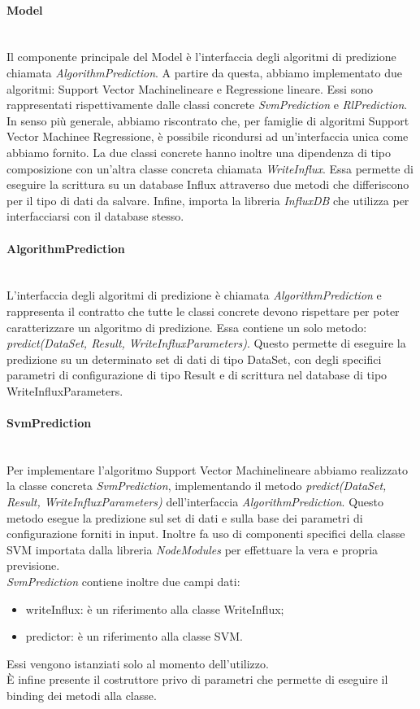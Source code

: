 \paragraph{Model} \mbox{}\\ [1mm]
Il componente principale del Model è l'interfaccia degli algoritmi di predizione chiamata \textit{AlgorithmPrediction}. A partire da questa, abbiamo implementato due algoritmi: Support Vector Machine\glosp lineare e Regressione lineare\glo. Essi sono rappresentati rispettivamente dalle classi concrete \textit{SvmPrediction} e \textit{RlPrediction}. In senso più generale, abbiamo riscontrato che, per famiglie di algoritmi Support Vector Machine\glosp e Regressione\glo, è possibile ricondursi ad un'interfaccia unica come abbiamo fornito.
La due classi concrete hanno inoltre una dipendenza di tipo composizione con un'altra classe concreta chiamata \textit{WriteInflux}. Essa permette di eseguire la scrittura su un database Influx attraverso due metodi che differiscono per il tipo di dati da salvare. Infine, importa la libreria \textit{InfluxDB} che utilizza per interfacciarsi con il database stesso.
\paragraph*{AlgorithmPrediction} \mbox{}\\ [1mm]
L'interfaccia degli algoritmi di predizione è chiamata \textit{AlgorithmPrediction} e rappresenta il contratto che tutte le classi concrete devono rispettare per poter caratterizzare un algoritmo di predizione. Essa contiene un solo metodo: \textit{predict(DataSet, Result, WriteInfluxParameters)}. Questo permette di eseguire la predizione su un determinato set di dati di tipo DataSet, con degli specifici parametri di configurazione di tipo Result e di scrittura nel database di tipo WriteInfluxParameters.
\paragraph*{SvmPrediction} \mbox{}\\ [1mm]
Per implementare l'algoritmo Support Vector Machine\glosp lineare abbiamo realizzato la classe concreta \textit{SvmPrediction}, implementando il metodo \textit{predict(DataSet, Result, WriteInfluxParameters)} dell'interfaccia \textit{AlgorithmPrediction}.
Questo metodo esegue la predizione sul set di dati e sulla base dei parametri di configurazione forniti in input. Inoltre fa uso di componenti specifici della classe SVM importata dalla libreria \textit{NodeModules} per effettuare la vera e propria previsione. \\
\textit{SvmPrediction} contiene inoltre due campi dati:
\begin{itemize}
	\item writeInflux: è un riferimento alla classe WriteInflux;
	\item predictor: è un riferimento alla classe SVM.
\end{itemize}
Essi vengono istanziati solo al momento dell'utilizzo. \\
È infine presente il costruttore privo di parametri che permette di eseguire il binding dei metodi alla classe.

